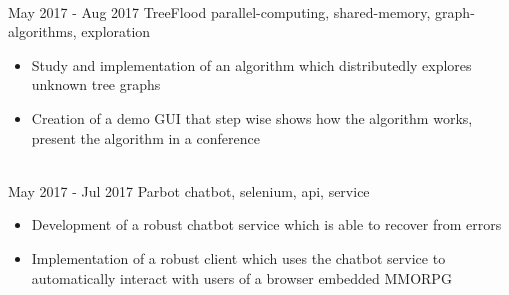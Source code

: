 \documentclass[letterpaper]{twentysecondcv} %
\begin{document}
\begin{twenty}
{\begin{itemize}
        		\end{itemize}}\\
	\twentyitem
    		{May 2017 -}
		{Aug 2017}
        		{TreeFlood}
        		{}
        		{parallel-computing, shared-memory, graph-algorithms, exploration}
        		{\begin{itemize}
        			\item Study and implementation of an algorithm which distributedly explores unknown tree graphs
        			\item Creation of a demo GUI that step wise shows how the algorithm works, present the algorithm in a conference
        		\end{itemize}}\\
	\twentyitem
    		{May 2017 -}
		{Jul 2017}
        		{Parbot}
        		{}
        		{chatbot, selenium, api, service}
        		{\begin{itemize}
        			\item Development of a robust chatbot service which is able to recover from errors
        			\item Implementation of a robust client which uses the chatbot service to automatically interact with
        				users of a browser embedded MMORPG
        		\end{itemize}}\\
\end{twenty}
\end{document}
